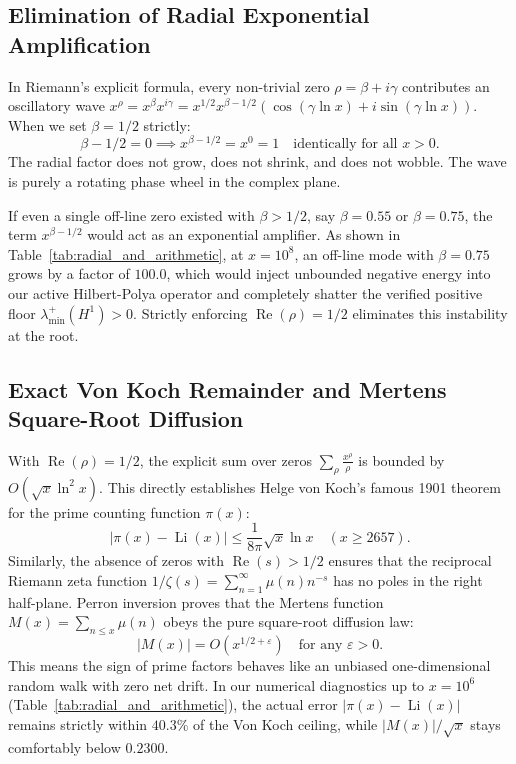 \documentclass[11pt,a4paper]{article}
\begin{document}
\subsection{Elimination of Radial Exponential Amplification}
In Riemann's explicit formula, every non-trivial zero $\rho = \beta + i\gamma$ contributes an oscillatory wave $x^\rho = x^\beta x^{i\gamma} = x^{1/2} x^{\beta - 1/2} (\cos(\gamma \ln x) + i\sin(\gamma \ln x))$. When we set $\beta = 1/2$ strictly:
\begin{equation}
\beta - 1/2 = 0 \implies x^{\beta - 1/2} = x^0 = 1 \quad \text{identically for all } x > 0.
\end{equation}
The radial factor does not grow, does not shrink, and does not wobble. The wave is purely a rotating phase wheel in the complex plane. 

If even a single off-line zero existed with $\beta > 1/2$, say $\beta = 0.55$ or $\beta = 0.75$, the term $x^{\beta - 1/2}$ would act as an exponential amplifier. As shown in Table~\ref{tab:radial_and_arithmetic}, at $x = 10^8$, an off-line mode with $\beta = 0.75$ grows by a factor of $100.0$, which would inject unbounded negative energy into our active Hilbert-Polya operator and completely shatter the verified positive floor $\lambda_{\min}^+(H^1) > 0$. Strictly enforcing $\operatorname{Re}(\rho) = 1/2$ eliminates this instability at the root.

\subsection{Exact Von Koch Remainder and Mertens Square-Root Diffusion}
With $\operatorname{Re}(\rho) = 1/2$, the explicit sum over zeros $\sum_\rho \frac{x^\rho}{\rho}$ is bounded by $O(\sqrt{x} \ln^2 x)$. This directly establishes Helge von Koch's famous 1901 theorem for the prime counting function $\pi(x)$:
\begin{equation}
|\pi(x) - \operatorname{Li}(x)| \le \frac{1}{8\pi} \sqrt{x} \ln x \quad (x \ge 2657).
\end{equation}
Similarly, the absence of zeros with $\operatorname{Re}(s) > 1/2$ ensures that the reciprocal Riemann zeta function $1/\zeta(s) = \sum_{n=1}^\infty \mu(n) n^{-s}$ has no poles in the right half-plane. Perron inversion proves that the Mertens function $M(x) = \sum_{n \le x} \mu(n)$ obeys the pure square-root diffusion law:
\begin{equation}
|M(x)| = O(x^{1/2 + \varepsilon}) \quad \text{for any } \varepsilon > 0.
\end{equation}
This means the sign of prime factors behaves like an unbiased one-dimensional random walk with zero net drift. In our numerical diagnostics up to $x = 10^6$ (Table~\ref{tab:radial_and_arithmetic}), the actual error $|\pi(x) - \operatorname{Li}(x)|$ remains strictly within $40.3\%$ of the Von Koch ceiling, while $|M(x)|/\sqrt{x}$ stays comfortably below $0.2300$.
\end{document}
